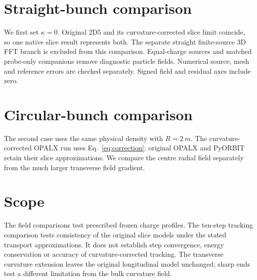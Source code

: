 \documentclass[10pt,a4paper]{article}
\begin{document}


\section{Straight-bunch comparison}
We first set $\kappa=0$. Original 2D5 and its curvature-corrected slice
limit coincide, so one native slice result represents both. The separate
straight finite-source 3D FFT branch is excluded from this comparison.
Equal-charge sources and matched probe-only companions remove diagnostic
particle fields. Numerical source, mesh and reference errors are checked
separately. Signed field and residual axes include zero.

\section{Circular-bunch comparison}
The second case uses the same physical density with $R=\SI{2}{m}$.
The curvature-corrected OPALX run uses Eq.~\eqref{eq:correction}; original
OPALX and PyORBIT retain their slice approximations. We compare the centre
radial field separately from the much larger transverse field gradient.



\section{Scope}
The field comparisons test prescribed frozen charge profiles. The ten-step
tracking comparison tests consistency of the original slice models under
the stated transport approximations. It does not establish step convergence,
energy conservation or accuracy of curvature-corrected tracking. The
transverse curvature extension leaves the original longitudinal model
unchanged; sharp ends test a different limitation from the bulk curvature field.

\end{document}

